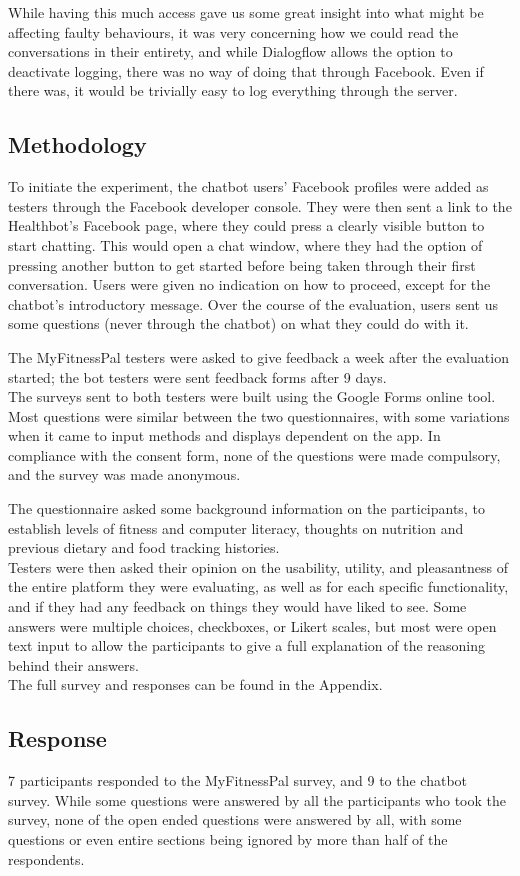 While having this much access gave us some great insight into what might be affecting faulty behaviours, it was very concerning how we could read the conversations in their entirety, and while Dialogflow allows the option to deactivate logging, there was no way of doing that through Facebook. Even if there was, it would be trivially easy to log everything through the server.
\subsection{Methodology}
To initiate the experiment, the chatbot users' Facebook profiles were added as testers through the Facebook developer console. They were then sent a link to the Healthbot's Facebook page, where they could press a clearly visible button to start chatting. This would open a chat window, where they had the option of pressing another button to get started before being taken through their first conversation. Users were given no indication on how to proceed, except for the chatbot's introductory message. Over the course of the evaluation, users sent us some questions (never through the chatbot) on what they could do with it. 

The MyFitnessPal testers were asked to give feedback a week after the evaluation started; the bot testers were sent feedback forms after 9 days.\\
The surveys sent to both testers were built using the Google Forms online tool. Most questions were similar between the two questionnaires, with some variations when it came to input methods and displays dependent on the app. In compliance with the consent form, none of the questions were made compulsory, and the survey was made anonymous.

The questionnaire asked some background information on the participants, to establish levels of fitness and computer literacy, thoughts on nutrition and previous dietary and food tracking histories.\\
Testers were then asked their opinion on the usability, utility, and pleasantness of the entire platform they were evaluating, as well as for each specific functionality, and if they had any feedback on things they would have liked to see. Some answers were multiple choices, checkboxes, or Likert scales, but most were open text input to allow the participants to give a full explanation of the reasoning behind their answers.\\
The full survey and responses can be found in the Appendix.
\subsection{Response}
7 participants responded to the MyFitnessPal survey, and 9 to the chatbot survey. While some questions were answered by all the participants who took the survey, none of the open ended questions were answered by all, with some questions or even entire sections being ignored by more than half of the respondents. 

